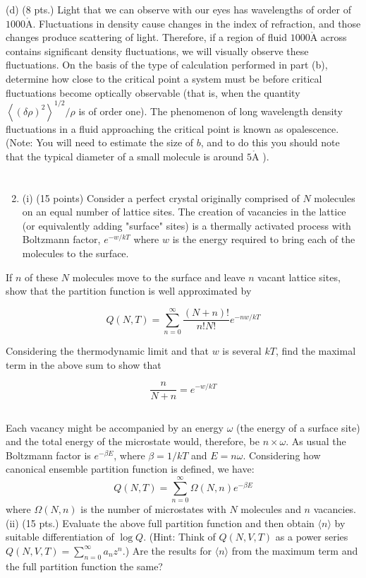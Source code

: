 \documentclass[10pt]{article}
\def\AA{\mathring{\mathrm{A}}}
\begin{document}
(d) (8 pts.) Light that we can observe with our eyes has wavelengths of order of $1000 \AA$. Fluctuations in density cause changes in the index of refraction, and those changes produce scattering of light. Therefore, if a region of fluid $1000 \AA$ across contains significant density fluctuations, we will visually observe these fluctuations. On the basis of the type of calculation performed in part (b), determine how close to the critical point a system must be before critical fluctuations become optically observable (that is, when the quantity $\left\langle(\delta \rho)^{2}\right\rangle^{1 / 2} / \rho$ is of order one). The phenomenon of long wavelength density fluctuations in a fluid approaching the critical point is known as opalescence. (Note: You will need to estimate the size of $b$, and to do this you should note that the typical diameter of a small molecule is around $5 \AA$ ).
\section{}
\begin{enumerate}
  \setcounter{enumi}{1}
  \item (i) (15 points) Consider a perfect crystal originally comprised of $N$ molecules on an equal number of lattice sites. The creation of vacancies in the lattice (or equivalently adding "surface" sites) is a thermally activated process with Boltzmann factor, $e^{-w / k T}$ where $w$ is the energy required to bring each of the molecules to the surface.
\end{enumerate}

If $n$ of these $N$ molecules move to the surface and leave $n$ vacant lattice sites, show that the partition function is well approximated by

$$
Q(N, T)=\sum_{n=0}^{\infty} \frac{(N+n) !}{n ! N !} e^{-n w / k T}
$$

Considering the thermodynamic limit and that $w$ is several $k T$, find the maximal term in the above sum to show that

$$
\frac{n}{N+n}=e^{-w / k T}
$$
\subsection{}
Each vacancy might be accompanied by an energy $\omega$ (the energy of a surface site) and the total energy of the microstate would, therefore, be $n\times \omega$.
As usual the Boltzmann factor is $e^{-\beta E}$, where $\beta=1/kT$ and $E=n\omega$.
Considering how canonical ensemble partition function is defined, we have:
\begin{equation}
  Q(N,T)=\sum_{n=0}^{\infty}\Omega (N,n)e^{-\beta E}
\end{equation}
where $\Omega (N,n)$ is the number of microstates with $N$ molecules and $n$ vacancies.
(ii) (15 pts.) Evaluate the above full partition function and then obtain $\langle n\rangle$ by suitable differentiation of $\log Q$. (Hint: Think of $Q(N, V, T)$ as a power series $Q(N, V, T)=\sum_{n=0}^{\infty} a_{n} z^{n}$.) Are the results for $\langle n\rangle$ from the maximum term and the full partition function the same?
\end{document}
